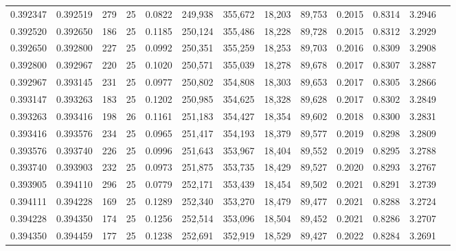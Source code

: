 \begin{tabular}{rrrrrrrrrrrrr}
0.392347 & 0.392519 &   279 &  25 &                                     0.0822 & 249,938 & 355,672 &  18,203 &  89,753 & 0.2015 & 0.8314 & 3.2946 \\
0.392520 & 0.392650 &   186 &  25 &                                     0.1185 & 250,124 & 355,486 &  18,228 &  89,728 & 0.2015 & 0.8312 & 3.2929 \\
0.392650 & 0.392800 &   227 &  25 &                                     0.0992 & 250,351 & 355,259 &  18,253 &  89,703 & 0.2016 & 0.8309 & 3.2908 \\
0.392800 & 0.392967 &   220 &  25 &                                     0.1020 & 250,571 & 355,039 &  18,278 &  89,678 & 0.2017 & 0.8307 & 3.2887 \\
0.392967 & 0.393145 &   231 &  25 &                                     0.0977 & 250,802 & 354,808 &  18,303 &  89,653 & 0.2017 & 0.8305 & 3.2866 \\
0.393147 & 0.393263 &   183 &  25 &                                     0.1202 & 250,985 & 354,625 &  18,328 &  89,628 & 0.2017 & 0.8302 & 3.2849 \\
0.393263 & 0.393416 &   198 &  26 &                                     0.1161 & 251,183 & 354,427 &  18,354 &  89,602 & 0.2018 & 0.8300 & 3.2831 \\
0.393416 & 0.393576 &   234 &  25 &                                     0.0965 & 251,417 & 354,193 &  18,379 &  89,577 & 0.2019 & 0.8298 & 3.2809 \\
0.393576 & 0.393740 &   226 &  25 &                                     0.0996 & 251,643 & 353,967 &  18,404 &  89,552 & 0.2019 & 0.8295 & 3.2788 \\
0.393740 & 0.393903 &   232 &  25 &                                     0.0973 & 251,875 & 353,735 &  18,429 &  89,527 & 0.2020 & 0.8293 & 3.2767 \\
0.393905 & 0.394110 &   296 &  25 &                                     0.0779 & 252,171 & 353,439 &  18,454 &  89,502 & 0.2021 & 0.8291 & 3.2739 \\
0.394111 & 0.394228 &   169 &  25 &                                     0.1289 & 252,340 & 353,270 &  18,479 &  89,477 & 0.2021 & 0.8288 & 3.2724 \\
0.394228 & 0.394350 &   174 &  25 &                                     0.1256 & 252,514 & 353,096 &  18,504 &  89,452 & 0.2021 & 0.8286 & 3.2707 \\
0.394350 & 0.394459 &   177 &  25 &                                     0.1238 & 252,691 & 352,919 &  18,529 &  89,427 & 0.2022 & 0.8284 & 3.2691 \\

\end{tabular}
